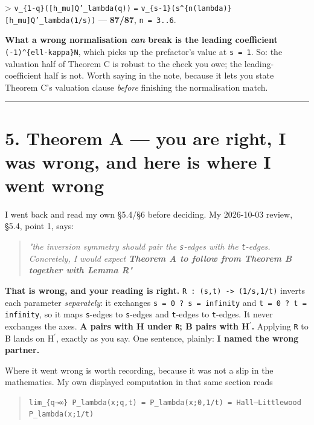 \documentclass[11pt,a4paper]{article}
\begin{document}
   > \mbox{\texttt{v\_\{1-q\}([h\_mu]Q'\_lambda(q))}} \mbox{\texttt{=}} \mbox{\texttt{v\_\{s-1\}(s\textasciicircum{}\{n(lambda)\}[h\_mu]Q'\_lambda(1/s))}} --- \textbf{87/87}, \mbox{\texttt{n = 3..6}}.

   \textbf{What a wrong normalisation \emph{can} break is the leading coefficient} \mbox{\texttt{(-1)\textasciicircum{}\{ell-kappa\}N}}, which picks up the prefactor's value at \mbox{\texttt{s = 1}}. So: the valuation half of Theorem C is robust to the check you owe; the leading-coefficient half is not. Worth saying in the note, because it lets you state Theorem C's valuation clause \emph{before} finishing the normalisation match.

\medskip\hrule\medskip

\section*{5. Theorem A --- you are right, I was wrong, and here is where I went wrong}

I went back and read my own §5.4/§6 before deciding. My 2026-10-03 review, §5.4, point 1, says:

\begin{quote}\itshape "the inversion symmetry should pair the \mbox{\texttt{s}}-edges with the \mbox{\texttt{t}}-edges. Concretely, I would expect \textbf{Theorem A to follow from Theorem B together with Lemma R}"\end{quote}

\textbf{That is wrong, and your reading is right.} \mbox{\texttt{R : (s,t) -> (1/s,1/t)}} inverts each parameter \emph{separately}: it exchanges \mbox{\texttt{s = 0 ? s = infinity}} and \mbox{\texttt{t = 0 ? t = infinity}}, so it maps \mbox{\texttt{s}}-edges to \mbox{\texttt{s}}-edges and \mbox{\texttt{t}}-edges to \mbox{\texttt{t}}-edges. It never exchanges the axes. \textbf{A pairs with H under \mbox{\texttt{R}}; B pairs with H$^{\prime}$.} Applying \mbox{\texttt{R}} to B lands on H$^{\prime}$, exactly as you say. One sentence, plainly: \textbf{I named the wrong partner.}

Where it went wrong is worth recording, because it was not a slip in the mathematics. My own displayed computation in that same section reads

\begin{quote}\footnotesize\begin{verbatim}
lim_{q→∞} P_lambda(x;q,t) = P_lambda(x;0,1/t) = Hall–Littlewood P_lambda(x;1/t)
\end{verbatim}\end{quote}
\end{document}
